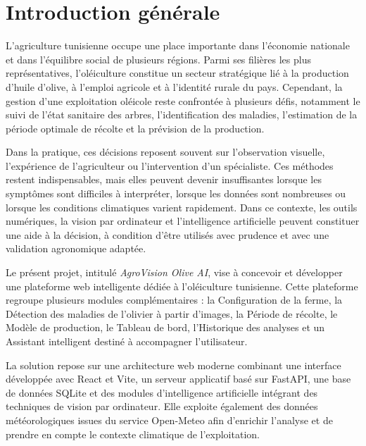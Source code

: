 \documentclass[12pt,a4paper]{report}
\begin{document}
\clearpage
{}

\chapter*{Introduction générale}

L'agriculture tunisienne occupe une place importante dans l'économie nationale et dans l'équilibre social de plusieurs régions. Parmi ses filières les plus représentatives, l'oléiculture constitue un secteur stratégique lié à la production d'huile d'olive, à l'emploi agricole et à l'identité rurale du pays. Cependant, la gestion d'une exploitation oléicole reste confrontée à plusieurs défis, notamment le suivi de l'état sanitaire des arbres, l'identification des maladies, l'estimation de la période optimale de récolte et la prévision de la production.

Dans la pratique, ces décisions reposent souvent sur l'observation visuelle, l'expérience de l'agriculteur ou l'intervention d'un spécialiste. Ces méthodes restent indispensables, mais elles peuvent devenir insuffisantes lorsque les symptômes sont difficiles à interpréter, lorsque les données sont nombreuses ou lorsque les conditions climatiques varient rapidement. Dans ce contexte, les outils numériques, la vision par ordinateur et l'intelligence artificielle peuvent constituer une aide à la décision, à condition d'être utilisés avec prudence et avec une validation agronomique adaptée.

Le présent projet, intitulé \textit{AgroVision Olive AI}, vise à concevoir et développer une plateforme web intelligente dédiée à l'oléiculture tunisienne. Cette plateforme regroupe plusieurs modules complémentaires : la Configuration de la ferme, la Détection des maladies de l'olivier à partir d'images, la Période de récolte, le Modèle de production, le Tableau de bord, l'Historique des analyses et un Assistant intelligent destiné à accompagner l'utilisateur.

La solution repose sur une architecture web moderne combinant une interface développée avec React et Vite, un serveur applicatif basé sur FastAPI, une base de données SQLite et des modules d'intelligence artificielle intégrant des techniques de vision par ordinateur. Elle exploite également des données météorologiques issues du service Open-Meteo afin d'enrichir l'analyse et de prendre en compte le contexte climatique de l'exploitation.
\end{document}
